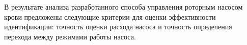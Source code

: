 В результате анализа разработанного способа управления роторным насосом крови предложены следующие критерии для оценки эффективности идентификации: точность оценки расхода насоса и точность определения перехода между режимами работы насоса.


